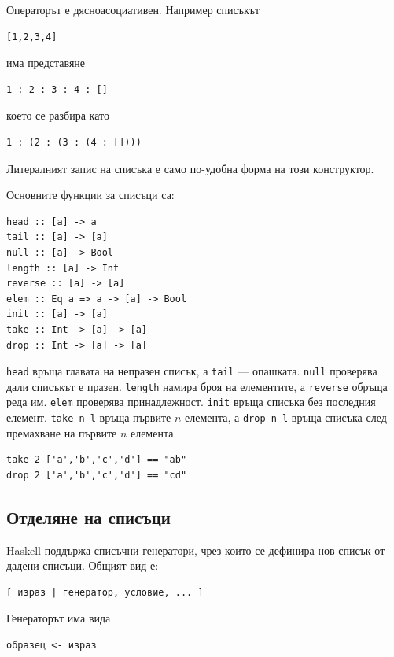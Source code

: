 Операторът е дясноасоциативен. Например списъкът

\begin{verbatim}
[1,2,3,4]
\end{verbatim}

има представяне

\begin{verbatim}
1 : 2 : 3 : 4 : []
\end{verbatim}

което се разбира като

\begin{verbatim}
1 : (2 : (3 : (4 : [])))
\end{verbatim}

Литералният запис на списъка е само по-удобна форма на този конструктор.

Основните функции за списъци са:

\begin{verbatim}
head :: [a] -> a
tail :: [a] -> [a]
null :: [a] -> Bool
length :: [a] -> Int
reverse :: [a] -> [a]
elem :: Eq a => a -> [a] -> Bool
init :: [a] -> [a]
take :: Int -> [a] -> [a]
drop :: Int -> [a] -> [a]
\end{verbatim}

\texttt{head} връща главата на непразен списък, а \texttt{tail} --- опашката. \texttt{null} проверява дали списъкът е празен. \texttt{length} намира броя на елементите, а \texttt{reverse} обръща реда им. \texttt{elem} проверява принадлежност. \texttt{init} връща списъка без последния елемент. \texttt{take n l} връща първите $n$ елемента, а \texttt{drop n l} връща списъка след премахване на първите $n$ елемента.

\begin{verbatim}
take 2 ['a','b','c','d'] == "ab"
drop 2 ['a','b','c','d'] == "cd"
\end{verbatim}

\subsection{Отделяне на списъци}\label{s:20.3.2}

Haskell поддържа списъчни генератори, чрез които се дефинира нов списък от дадени списъци. Общият вид е:

\begin{verbatim}
[ израз | генератор, условие, ... ]
\end{verbatim}

Генераторът има вида

\begin{verbatim}
образец <- израз
\end{verbatim}

